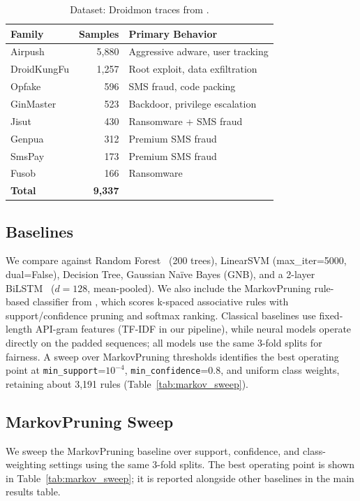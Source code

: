 \documentclass[12pt]{report}
\begin{document}
\begin{table}[t]
\centering
\caption{Dataset: Droidmon traces from \citet{dangelo2023kspaced}.}
\label{tab:dataset}
\begin{tabular}{lrl}
\toprule
\textbf{Family} & \textbf{Samples} & \textbf{Primary Behavior} \\
\midrule
Airpush      & 5,880 & Aggressive adware, user tracking \\
DroidKungFu  & 1,257 & Root exploit, data exfiltration \\
Opfake       &   596 & SMS fraud, code packing \\
GinMaster    &   523 & Backdoor, privilege escalation \\
Jisut        &   430 & Ransomware + SMS fraud \\
Genpua       &   312 & Premium SMS fraud \\
SmsPay       &   173 & Premium SMS fraud \\
Fusob        &   166 & Ransomware \\
\midrule
\textbf{Total} & \textbf{9,337} & \\
\bottomrule
\end{tabular}
\end{table}

\subsection{Baselines}
We compare against Random Forest~\citep{breiman2001rf} (200 trees),
LinearSVM (max\_iter=5000, dual=False), Decision Tree, Gaussian
Na\"{i}ve Bayes (GNB), and a 2-layer BiLSTM~\citep{hochreiter1997lstm}
($d=128$, mean-pooled). We also include the MarkovPruning rule-based
classifier from \citet{dangelo2023kspaced}, which scores k-spaced
associative rules with support/confidence pruning and softmax ranking.
Classical baselines use fixed-length API-gram features (TF-IDF in our
pipeline), while neural models operate directly on the padded sequences;
all models use the same 3-fold splits for fairness. A sweep over
MarkovPruning thresholds identifies the best operating point at
\texttt{min\_support}=$10^{-4}$, \texttt{min\_confidence}=0.8, and uniform
class weights, retaining about 3,191 rules (Table~\ref{tab:markov_sweep}).

\subsection{MarkovPruning Sweep}
We sweep the MarkovPruning baseline over support, confidence, and
class-weighting settings using the same 3-fold splits. The best operating
point is shown in Table~\ref{tab:markov_sweep}; it is reported alongside
other baselines in the main results table.
\end{document}
